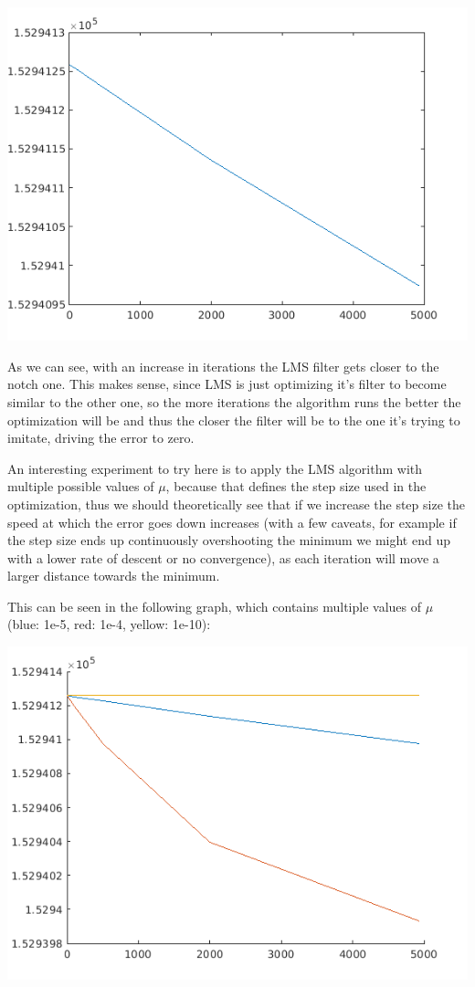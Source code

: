 \documentclass[conference,9pt]{IEEEtran}
\begin{document}
\includegraphics[scale=0.6]{error-evolution.png}

As we can see, with an increase in iterations the LMS filter gets closer to the notch one. This makes sense, since LMS is just optimizing it's filter to become similar to the other one, so the more iterations the algorithm runs the better the optimization will be and thus the closer the filter will be to the one it's trying to imitate, driving the error to zero.

An interesting experiment to try here is to apply the LMS algorithm with multiple possible values of $\mu$, because that defines the step size used in the optimization, thus we should theoretically see that if we increase the step size the speed at which the error goes down increases (with a few caveats, for example if the step size ends up continuously overshooting the minimum we might end up with a lower rate of descent or no convergence), as each iteration will move a larger distance towards the minimum.

This can be seen in the following graph, which contains multiple values of $\mu$ (blue: 1e-5, red: 1e-4, yellow: 1e-10):

\includegraphics[scale=0.6]{mus.png}
\end{document}
